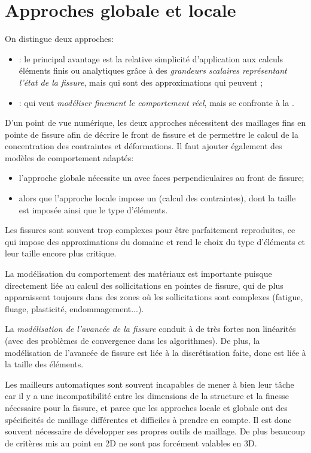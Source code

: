 \section{Approches globale et locale}
On distingue deux approches:
\begin{itemize}
  \item {}: le principal avantage est la relative simplicité d'application aux calculs éléments finis ou analytiques grâce à des \emph{grandeurs scalaires représentant l'état de la fissure}, mais qui sont des approximations qui peuvent ;
  \item {}: qui veut \emph{modéliser finement le comportement réel}, mais se confronte à la .
\end{itemize}
\medskipvm
D'un point de vue numérique, les deux approches nécessitent des maillages fins en pointe de fissure afin de décrire le front de fissure et de permettre le calcul de la concentration des contraintes et déformations. Il faut ajouter également des modèles de comportement adaptés:
\begin{itemize}
  \item l'approche globale nécessite un  avec faces perpendiculaires au front de fissure;
  \item alors que l'approche locale impose un  (calcul des contraintes), dont la taille est imposée ainsi que le type d'éléments.
\end{itemize}
\medskipvm
Les fissures sont souvent trop complexes pour être parfaitement reproduites, ce qui impose des approximations du domaine et rend le choix du type d'éléments et leur taille encore plus critique.

La modélisation du comportement des matériaux est importante puisque directement liée au calcul des sollicitations en pointes de fissure, qui de plus apparaissent toujours dans des zones où les sollicitations sont complexes (fatigue, fluage, plasticité, endommagement...).

La \emph{modélisation de l'avancée de la fissure} conduit à de très fortes non linéarités (avec des problèmes de convergence dans les algorithmes). De plus, la modélisation de l'avancée de fissure est liée à la discrétisation faite, donc est liée à la taille des éléments.

\medskip
Les mailleurs automatiques sont souvent incapables de mener à bien leur tâche car il y a une incompatibilité entre les dimensions de la structure et la finesse nécessaire pour la fissure, et parce que les approches locale et globale ont des spécificités de maillage différentes et difficiles à prendre en compte. Il est donc souvent nécessaire de développer ses propres outils de maillage. De plus beaucoup de critères mis au point en 2D ne sont pas forcément valables en 3D.

